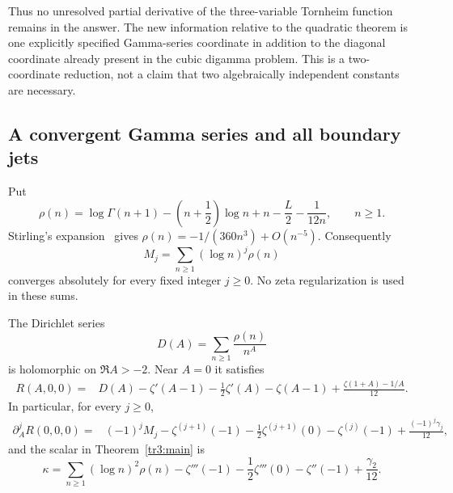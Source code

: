 Thus no unresolved partial derivative of the three-variable Tornheim
function remains in the answer.  The new information relative to the
quadratic theorem is one explicitly specified Gamma-series coordinate
in addition to the diagonal coordinate already present in the cubic
digamma problem.  This is a two-coordinate reduction, not a claim that
two algebraically independent constants are necessary.

\subsection{A convergent Gamma series and all boundary jets}

Put
\begin{equation}\label{tr3:rho}
 \rho(n)=\log\Gamma(n+1)-\left(n+\frac12\right)\log n
            +n-\frac L2-\frac{1}{12n},\qquad n\geq1.
\end{equation}
Stirling's expansion~\cite[\S5.11]{tr3:DLMF} gives $\rho(n)=-1/(360n^3)+O(n^{-5})$.
Consequently
\[
 M_j=\sum_{n\geq1}(\log n)^j\rho(n)
\]
converges absolutely for every fixed integer $j\geq0$.  No zeta
regularization is used in these sums.

\begin{theorem}
\label{tr3:boundary}
The Dirichlet series
\[
 D(A)=\sum_{n\geq1}\frac{\rho(n)}{n^A}
\]
is holomorphic on $\Re A>-2$.  Near $A=0$ it satisfies
\begin{align}\label{tr3:boundarygerm}
 R(A,0,0)={}&D(A)-\zeta'(A-1)-\frac12\zeta'(A)
            -\zeta(A-1)
            +\frac{\zeta(1+A)-1/A}{12}.
\end{align}
In particular, for every $j\geq0$,
\begin{align}\label{tr3:boundaryjets}
 \partial_A^jR(0,0,0)
 ={}&(-1)^j M_j-\zeta^{(j+1)}(-1)
 -\frac12\zeta^{(j+1)}(0)-\zeta^{(j)}(-1)
 +\frac{(-1)^j\gamma_j}{12},
\end{align}
and the scalar in Theorem~\ref{tr3:main} is
\begin{equation}\label{tr3:kappa}
 \boxed{\displaystyle
 \kappa=\sum_{n\geq1}(\log n)^2\rho(n)
       -\zeta'''(-1)-\frac12\zeta'''(0)-\zeta''(-1)
       +\frac{\gamma_2}{12}.}
\end{equation}
\end{theorem}


